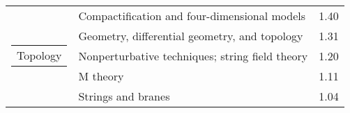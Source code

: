 \begin{longtable}[H]{p{}|p{}|p{}}
\cline{1-3}
\multirow{5}{*}{\begin{tabular}{l}Topology\end{tabular}} & Compactification and four-dimensional models &  1.40 \\
                                        & Geometry, differential geometry, and topology &  1.31 \\
                                        & Nonperturbative techniques; string field theory &  1.20 \\
                                        & M theory &  1.11 \\
                                        & Strings and branes &  1.04 \\
\end{longtable}
